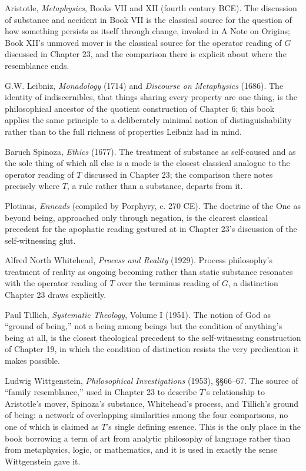 \documentclass[11pt]{book}
\begin{document}
Aristotle, \emph{Metaphysics}, Books VII and XII (fourth century BCE). The discussion of substance and accident in Book VII is the classical source for the question of how something persists as itself through change, invoked in A Note on Origins; Book XII's unmoved mover is the classical source for the operator reading of $G$ discussed in Chapter 23, and the comparison there is explicit about where the resemblance ends.

G.W. Leibniz, \emph{Monadology} (1714) and \emph{Discourse on Metaphysics} (1686). The identity of indiscernibles, that things sharing every property are one thing, is the philosophical ancestor of the quotient construction of Chapter 6; this book applies the same principle to a deliberately minimal notion of distinguishability rather than to the full richness of properties Leibniz had in mind.

Baruch Spinoza, \emph{Ethics} (1677). The treatment of substance as self-caused and as the sole thing of which all else is a mode is the closest classical analogue to the operator reading of $T$ discussed in Chapter 23; the comparison there notes precisely where $T$, a rule rather than a substance, departs from it.

Plotinus, \emph{Enneads} (compiled by Porphyry, c. 270 CE). The doctrine of the One as beyond being, approached only through negation, is the clearest classical precedent for the apophatic reading gestured at in Chapter 23's discussion of the self-witnessing glut.

Alfred North Whitehead, \emph{Process and Reality} (1929). Process philosophy's treatment of reality as ongoing becoming rather than static substance resonates with the operator reading of $T$ over the terminus reading of $G$, a distinction Chapter 23 draws explicitly.

Paul Tillich, \emph{Systematic Theology}, Volume I (1951). The notion of God as ``ground of being,'' not a being among beings but the condition of anything's being at all, is the closest theological precedent to the self-witnessing construction of Chapter 19, in which the condition of distinction resists the very predication it makes possible.

Ludwig Wittgenstein, \emph{Philosophical Investigations} (1953), \S\S 66--67. The source of ``family resemblance,'' used in Chapter 23 to describe $T$'s relationship to Aristotle's mover, Spinoza's substance, Whitehead's process, and Tillich's ground of being: a network of overlapping similarities among the four comparisons, no one of which is claimed as $T$'s single defining essence. This is the only place in the book borrowing a term of art from analytic philosophy of language rather than from metaphysics, logic, or mathematics, and it is used in exactly the sense Wittgenstein gave it.
\end{document}
